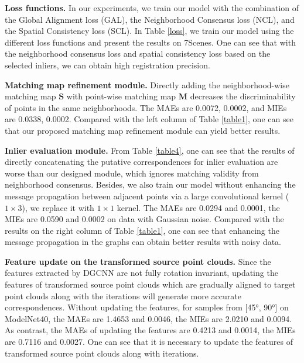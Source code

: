 \documentclass[letterpaper]{article} %
\begin{document}
	\noindent \textbf{Loss functions.}
	In our experiments, we train our model with the combination of the Global Alignment loss (GAL), the Neighborhood Consensus loss (NCL), and the Spatial Consistency loss (SCL). In Table \ref{loss}, we train our model using the different loss functions and present the results on 7Scenes. One can see that with the neighborhood consensus loss and spatial consistency loss based on the selected inliers, we can obtain high registration precision.
	
	\noindent \textbf {Matching map refinement module.} Directly adding the neighborhood-wise matching map $\mathbf{S}$ with point-wise matching map $\mathbf{M}$ decreases the discriminability of points in the same neighborhoods. The MAEs are 0.0072, 0.0002, and MIEs are 0.0338, 0.0002. Compared with the left column of Table \ref{table1}, one can see that our proposed matching map refinement module can yield better results.
	
	\noindent \textbf{Inlier evaluation module.}
	From Table \ref{table4}, one can see that the results of directly concatenating the putative correspondences for inlier evaluation are worse than our designed module, which ignores matching validity from neighborhood consensus. Besides, we also train our model without enhancing the message propagation between adjacent points via a large convolutional kernel ($1 \times 3$), we replace it with $1 \times 1$ kernel. The MAEs are 0.0294 and 0.0001, the MIEs are 0.0590 and 0.0002 on data with Gaussian noise. Compared with the results on the right column of Table \ref{table1}, one can see that enhancing the message propagation in the graphs can obtain better results with noisy data.
	
	\noindent \textbf {Feature update on the transformed source point clouds.} Since the features extracted by DGCNN are not fully rotation invariant, updating the features of transformed source point clouds which are gradually aligned to target point clouds along with the iterations will generate more accurate correspondences. Without updating the features, for samples from [\ang{45}, \ang{90}] on ModelNet40, the MAEs are 1.4653 and 0.0046, the MIEs are 2.0210 and 0.0094. As contrast, the MAEs of updating the features are 0.4213 and 0.0014, the MIEs are 0.7116 and 0.0027. One can see that it is necessary to update the features of transformed source point clouds along with iterations.
	
\end{document}
